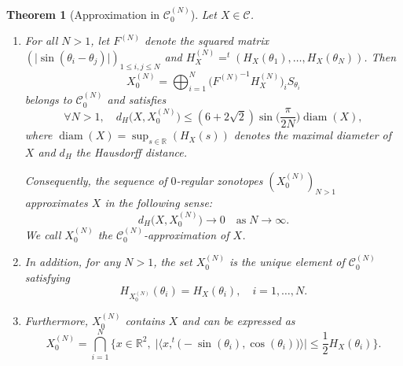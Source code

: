 \documentclass[numbers,compress,v1.0.1]{vmsta}
\newtheorem{theorem}{Theorem}
\theoremstyle{definition}
\begin{document}
\begin{theorem}[Approximation in $\mathcal{C}^{(N)}_0$]
Let $X\in\mathcal{C}$.
%
\begin{enumerate}
%
\item For all $N>1$, let $F^{(N)}$ denote the squared matrix $(\vert
\sin(\theta_i-\theta_j)\vert)_{1\leq i,j\leq N}$ and
$H^{(N)}_X=^t(H_X(\theta_1),\dots, H_X(\theta_N))$. Then
%
\begin{equation}
X_0^{(N)} =\bigoplus^N_{i=1}
\bigl({F^{(N)}}^{-1}H^{(N)}_X
\bigr)_i S_{\theta_i} \label{eq:prop:N-0-approxExpression}
\end{equation}
%
belongs to $\mathcal{C}^{(N)}_0$ and satisfies
%
\begin{equation}
\forall N>1, \quad d_H\bigl(X,X_0^{(N)}\bigr)
\leq(6+2\sqrt{2})\sin\biggl(\frac{\pi}{2N}\biggr)\operatorname{diam}(X), \label{eq:majorApprox}
\end{equation}
%
where $\operatorname{diam}(X)=\sup_{s\in\mathbb{R}}(H_X(s))$ denotes the maximal
diameter of $X$ and $d_H$ the Hausdorff distance.

Consequently, the sequence of $0$-regular zonotopes $(X_0^{(N)})_{N>1}$
approximates $X$ in the following sense:
%
\begin{equation}
d_H\bigl(X,X_0^{(N)}\bigr)\longrightarrow0\quad
\text{as}\; N\longrightarrow\infty. \label{eq:prop:limites}
\end{equation}
%
We call $X_0^{(N)}$ the $\mathcal{C}^{(N)}_0$-approximation of $X$.
%
\item In addition, for any $N>1$, the set $X_0^{(N)}$ is the unique
element of $\mathcal{C}^{(N)}_0$ satisfying
%
\begin{equation}
H_{X_0^{(N)}}(\theta_i)=H_X(\theta_i),\quad
i=1,\dots,N.
\end{equation}
%
\item Furthermore, $X_0^{(N)}$ contains $X$ and can be expressed as
%
\begin{equation}
X_0^{(N)}=\bigcap_{i=1}^N
\biggl\lbrace x\in\mathbb{R}^2,\; \bigl\vert\bigl\langle x,^t\bigl(-\sin (
\theta_i),\cos(\theta_i)\bigr)\bigr\rangle\bigr\vert\leq
\frac{1}{2}H_X(\theta_i)\biggr\rbrace.
\label{eq:prop:N-0-approxExpression2}
\end{equation}
%
\label{thm:approx}
\end{enumerate}
%
\end{theorem}
\end{document}
